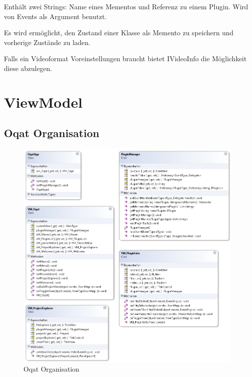 Enthält zwei Strings: Name eines Mementos und Referenz zu einem Plugin. Wird von Events als Argument benutzt.


Es wird ermöglicht, den Zustand einer Klasse als Memento zu speichern und vorherige Zustände zu laden.


Falls ein Videoformat Voreinstellungen braucht bietet IVideoInfo die Möglichkeit diese abzulegen.



\pagebreak
\section{ViewModel}

\subsection{Oqat Organisation}
\begin{figure}[H]
\noindent\includegraphics[width=\linewidth,height=\textheight,
keepaspectratio]{bilder/Klassendiagramm/VM.png}
\caption{Oqat Organisation}
\end{figure}

